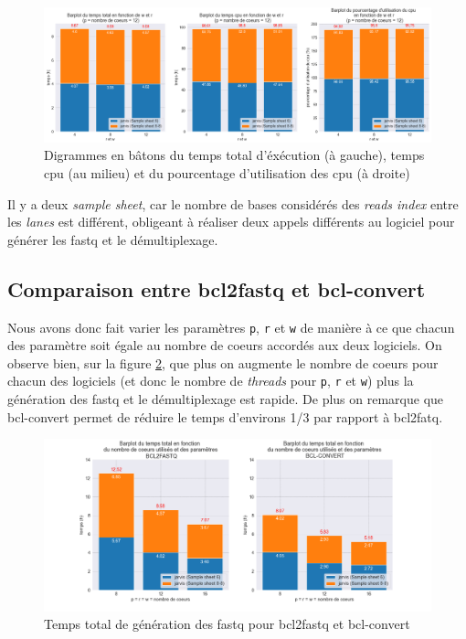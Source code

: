 \begin{figure}[H]
    \centering
    \includegraphics[width=1\textwidth]{img/barplot_cum_jarvis2.png}
    \caption{\footnotesize{Digrammes en bâtons du temps total d'éxécution (à gauche), temps cpu (au milieu) et du pourcentage d'utilisation des cpu (à droite)}}
    \label{barplot-param}
\end{figure} 
Il y a deux \emph{sample sheet}, car le nombre de bases considérés des \emph{reads index} entre les \emph{lanes} est différent, obligeant à réaliser deux appels différents au logiciel pour générer les fastq et le démultiplexage.

\subsection{Comparaison entre bcl2fastq et bcl-convert}
Nous avons donc fait varier les paramètres \texttt{p}, \texttt{r} et \texttt{w} de manière à ce que chacun des paramètre soit égale au nombre de coeurs accordés aux deux logiciels. On observe bien, sur la figure \ref{fig-total-time}, que plus on augmente le nombre de coeurs pour chacun des logiciels (et donc le nombre de \emph{threads} pour \texttt{p}, \texttt{r} et \texttt{w}) plus la génération des fastq et le démultiplexage est rapide. De plus on remarque que bcl-convert permet de réduire le temps d'environs 1/3 par rapport à bcl2fatq. 

\begin{figure}[H]
    \centering
    \includegraphics[width=1\textwidth]{img/barplot_total_time_comp.png}
    \caption{\footnotesize{Temps total de génération des fastq pour bcl2fastq et bcl-convert}}
    \label{fig-total-time}
\end{figure}


